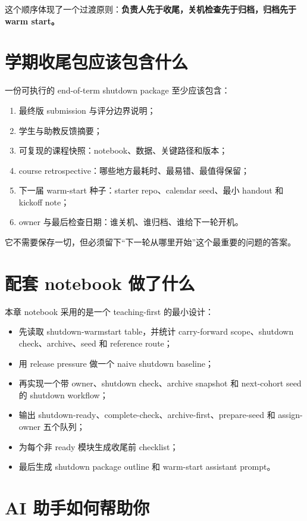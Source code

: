 这个顺序体现了一个过渡原则：\textbf{负责人先于收尾，关机检查先于归档，归档先于 warm start。}

\section{学期收尾包应该包含什么}

一份可执行的 end-of-term shutdown package 至少应该包含：

\begin{enumerate}
    \item 最终版 submission 与评分边界说明；
    \item 学生与助教反馈摘要；
    \item 可复现的课程快照：notebook、数据、关键路径和版本；
    \item course retrospective：哪些地方最耗时、最易错、最值得保留；
    \item 下一届 warm-start 种子：starter repo、calendar seed、最小 handout 和 kickoff note；
    \item owner 与最后检查日期：谁关机、谁归档、谁给下一轮开机。
\end{enumerate}

它不需要保存一切，但必须留下“下一轮从哪里开始”这个最重要的问题的答案。

\section{配套 notebook 做了什么}

本章 notebook 采用的是一个 teaching-first 的最小设计：

\begin{itemize}
    \item 先读取 shutdown-warmstart table，并统计 carry-forward scope、shutdown check、archive、seed 和 reference route；
    \item 用 release pressure 做一个 naive shutdown baseline；
    \item 再实现一个带 owner、shutdown check、archive snapshot 和 next-cohort seed 的 shutdown workflow；
    \item 输出 shutdown-ready、complete-check、archive-first、prepare-seed 和 assign-owner 五个队列；
    \item 为每个非 ready 模块生成收尾前 checklist；
    \item 最后生成 shutdown package outline 和 warm-start assistant prompt。
\end{itemize}

\section{AI 助手如何帮助你}

